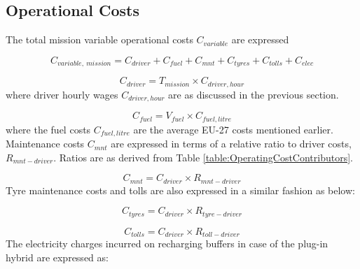 \documentclass[ExampleMasters.tex]{subfiles}
\begin{document}
		\subsection{Operational Costs}
			The total mission variable operational costs $C_{variable}$ are expressed
			
			\begin{equation}
				C_{variable,\ mission} = C_{driver} + C_{fuel} + C_{mnt} + C_{tyres} + C_{tolls} + C_{elec}
			\end{equation}

			\begin{equation}
				C_{driver} = T_{mission} \times C_{driver, hour}
			\end{equation}
			where driver hourly wages $C_{driver, hour}$ are as discussed in the previous section.

			\begin{equation}
				C_{fuel} = V_{fuel} \times C_{fuel, litre}
			\end{equation}
			where the fuel costs $C_{fuel, litre}$ are the average EU-27 costs mentioned earlier. Maintenance costs $C_{mnt}$ are expressed in terms of a relative ratio to driver costs, $R_{mnt-driver}$. Ratios are as derived from Table \ref{table:OperatingCostContributors}.         

			\begin{equation}
				C_{mnt} = C_{driver} \times R_{mnt-driver}
			\end{equation}
			Tyre maintenance costs and tolls are also expressed in a similar fashion as below:

			\begin{equation}
				C_{tyres} = C_{driver} \times R_{tyre-driver}
			\end{equation}

			\begin{equation}
				C_{tolls} = C_{driver} \times R_{toll-driver}
			\end{equation}
			The electricity charges incurred on recharging buffers in case of the plug-in hybrid are expressed as:
\end{document}
